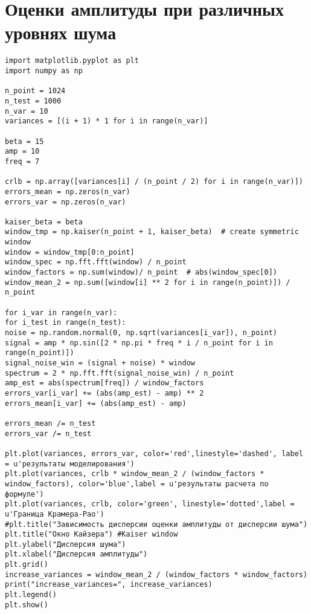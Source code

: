 \chapter{Оценки амплитуды при различных уровнях шума}\label{app:Е}
\begin{lstlisting}
import matplotlib.pyplot as plt
import numpy as np

n_point = 1024
n_test = 1000
n_var = 10
variances = [(i + 1) * 1 for i in range(n_var)]

beta = 15
amp = 10
freq = 7

crlb = np.array([variances[i] / (n_point / 2) for i in range(n_var)])
errors_mean = np.zeros(n_var)
errors_var = np.zeros(n_var)

kaiser_beta = beta
window_tmp = np.kaiser(n_point + 1, kaiser_beta)  # create symmetric window
window = window_tmp[0:n_point]
window_spec = np.fft.fft(window) / n_point
window_factors = np.sum(window)/ n_point  # abs(window_spec[0])
window_mean_2 = np.sum([window[i] ** 2 for i in range(n_point)]) / n_point

for i_var in range(n_var):
for i_test in range(n_test):
noise = np.random.normal(0, np.sqrt(variances[i_var]), n_point)
signal = amp * np.sin([2 * np.pi * freq * i / n_point for i in range(n_point)])
signal_noise_win = (signal + noise) * window
spectrum = 2 * np.fft.fft(signal_noise_win) / n_point
amp_est = abs(spectrum[freq]) / window_factors
errors_var[i_var] += (abs(amp_est) - amp) ** 2
errors_mean[i_var] += (abs(amp_est) - amp)

errors_mean /= n_test
errors_var /= n_test

plt.plot(variances, errors_var, color='red',linestyle='dashed', label = u'результаты моделирования')
plt.plot(variances, crlb * window_mean_2 / (window_factors * window_factors), color='blue',label = u'результаты расчета по формуле')
plt.plot(variances, crlb, color='green', linestyle='dotted',label = u'Граница Крамера-Рао')
#plt.title("Зависимость дисперсии оценки амплитуды от дисперсии шума")
plt.title("Окно Кайзера") #Kaiser window
plt.ylabel("Дисперсия шума")
plt.xlabel("Дисперсия амплитуды")
plt.grid()
increase_variances = window_mean_2 / (window_factors * window_factors)
print("increase_variances=", increase_variances)
plt.legend()
plt.show()	
\end{lstlisting}


